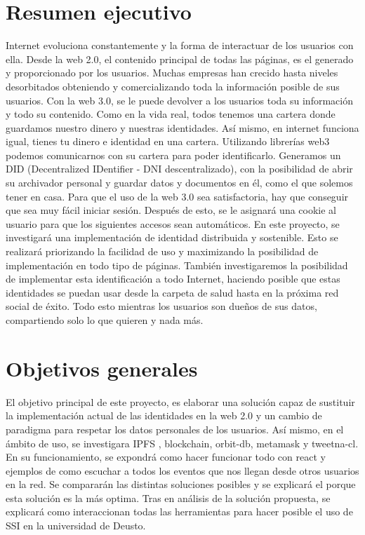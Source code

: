 \section{Resumen ejecutivo}
Internet evoluciona constantemente y la forma de interactuar de los usuarios con ella. Desde la web 2.0, el contenido principal de todas las páginas, es el generado y proporcionado por los usuarios. Muchas empresas han crecido hasta niveles desorbitados obteniendo y comercializando toda la información posible de sus usuarios. Con la web 3.0, se le puede devolver a los usuarios toda su información y todo su contenido. Como en la vida real, todos tenemos una cartera donde guardamos nuestro dinero y nuestras identidades. Así mismo, en internet funciona igual, tienes tu dinero e identidad en una cartera. Utilizando librerías web3 podemos comunicarnos con su cartera para poder identificarlo. Generamos un DID (Decentralized IDentifier - DNI descentralizado), con la posibilidad de abrir su archivador personal y guardar datos y documentos en él, como el que solemos tener en casa. Para que el uso de la web 3.0 sea satisfactoria, hay que conseguir que sea muy fácil iniciar sesión. Después de esto, se le asignará una cookie al usuario para que los siguientes accesos sean automáticos. En este proyecto, se investigará una implementación de identidad distribuida y sostenible. Esto se realizará priorizando la facilidad de uso y maximizando la posibilidad de implementación en todo tipo de páginas. También investigaremos la posibilidad de implementar esta identificación a todo Internet, haciendo posible que estas identidades se puedan usar desde la carpeta de salud hasta en la próxima red social de éxito. Todo esto mientras los usuarios son dueños de sus datos, compartiendo solo lo que quieren y nada más.
\section{Objetivos generales}
El objetivo principal de este proyecto, es elaborar una solución capaz de sustituir la implementación actual de las identidades en la web 2.0 y un cambio de paradigma para respetar los datos personales de los usuarios. Así mismo, en el ámbito de uso, se investigara IPFS \cite{web:ipfs}, blockchain, orbit-db, metamask y tweetna-cl. En su funcionamiento, se expondrá como hacer funcionar todo con react y ejemplos de como escuchar a todos los eventos que nos llegan desde otros usuarios en la red. Se compararán las distintas soluciones posibles y se explicará el porque esta solución es la más optima.
Tras en análisis de la solución propuesta, se explicará como interaccionan todas las herramientas para hacer posible el uso de SSI en la universidad de Deusto.
